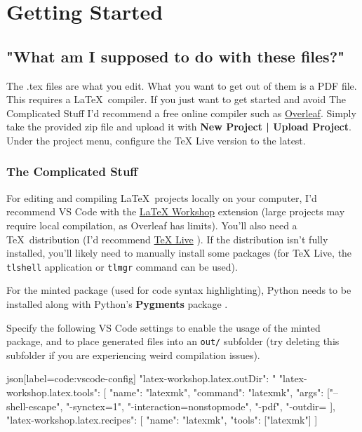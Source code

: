 \section{Getting Started}

\subsection{"What am I supposed to do with these files?"}

The .tex files are what you edit.
What you want to get out of them is a PDF file.
This requires a \LaTeX\ compiler.
If you just want to get started and avoid The Complicated Stuff I'd recommend a free online compiler such as \href{https://www.overleaf.com/}{Overleaf}.
Simply take the provided zip file and upload it with \textbf{New Project | Upload Project}.
Under the project menu, configure the TeX Live version to the latest.

\subsubsection{The Complicated Stuff}

For editing and compiling \LaTeX\ projects locally on your computer, I'd recommend VS Code with the \href{https://marketplace.visualstudio.com/items?itemName=James-Yu.latex-workshop}{LaTeX Workshop} extension \parencite{workshop} (large projects may require local compilation, as Overleaf has limits).
You'll also need a \TeX\ distribution (I'd recommend \href{https://www.tug.org/texlive/acquire-netinstall.html}{TeX Live} \parencite{texlive}).
If the distribution isn't fully installed, you'll likely need to manually install some packages (for TeX Live, the \verb|tlshell| application or \verb|tlmgr| command can be used).

For the minted package (used for code syntax highlighting), Python needs to be installed along with Python's \textbf{Pygments} package \parencite{pygmentize}.

Specify the following VS Code settings to enable the usage of the minted package, and to place generated files into an \texttt{out/} subfolder (try deleting this subfolder if you are experiencing weird compilation issues).
\begin{code}{json}[label=code:vscode-config]
"latex-workshop.latex.outDir": "%
"latex-workshop.latex.tools": [{
    "name": "latexmk",
    "command": "latexmk",
    "args": ["--shell-escape", "-synctex=1", "-interaction=nonstopmode", "-pdf", "-outdir=%
}],
"latex-workshop.latex.recipes": [{
    "name": "latexmk",
    "tools": ["latexmk"]
}]
\end{code}

